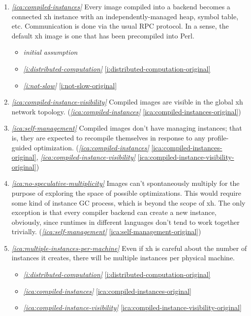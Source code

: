 \documentclass{report}
\makeatletter
\newcommand*{\Label}[2]{%
  \@bsphack
  \begingroup
    \label{#1-original}%
    \def\@currentlabel{#2}%
    \label{#1}%
  \endgroup
  \@esphack
}
\newcommand{\initial}{{\em initial assumption}}
\newcommand{\refboth}[1]{{\em \ref{#1}} \ref{#1-original}}
\makeatother
\begin{document}
\begin{enumerate}
\item{}\Label{ica:compiled-instances}{ca.compiledinstances}{\em\ref{ica:compiled-instances}}
  Every image compiled into a backend becomes a connected xh instance with
  an independently-managed heap, symbol table, etc. Communication is done
  via the usual RPC protocol. In a sense, the default xh image is one that
  has been precompiled into Perl.
\begin{itemize}
\item \initial
\item \refboth{i:distributed-computation}
\item \refboth{i:not-slow}
\end{itemize}
\item{}\Label{ica:compiled-instance-visibility}{ca.compiledvisibility}{\em\ref{ica:compiled-instance-visibility}}
  Compiled images are visible in the global xh network topology.
(\refboth{ica:compiled-instances})
\item{}\Label{ica:self-management}{ca.selfmanagement}{\em\ref{ica:self-management}}
  Compiled images don't have managing instances; that is, they are expected
  to recompile themselves in response to any profile-guided optimization.
(\refboth{ica:compiled-instances}, \refboth{ica:compiled-instance-visibility})
\item{}\Label{ica:no-speculative-multiplicity}{ca.nomultiplicity}{\em\ref{ica:no-speculative-multiplicity}}
  Images can't spontaneously multiply for the purpose of exploring the
  space of possible optimizations. This would require some kind of instance
  GC process, which is beyond the scope of xh. The only exception is that
  every compiler backend can create a new instance, obviously, since
  runtimes in different languages don't tend to work together trivially.
(\refboth{ica:self-management})
\item{}\Label{ica:multiple-instances-per-machine}{ca.mipermachine}{\em\ref{ica:multiple-instances-per-machine}}
  Even if xh is careful about the number of instances it creates, there
  will be multiple instances per physical machine.
\begin{itemize}
\item \refboth{i:distributed-computation}
\item \refboth{ica:compiled-instances}
\item \refboth{ica:compiled-instance-visibility}
\end{itemize}


\end{enumerate}
\end{document}

